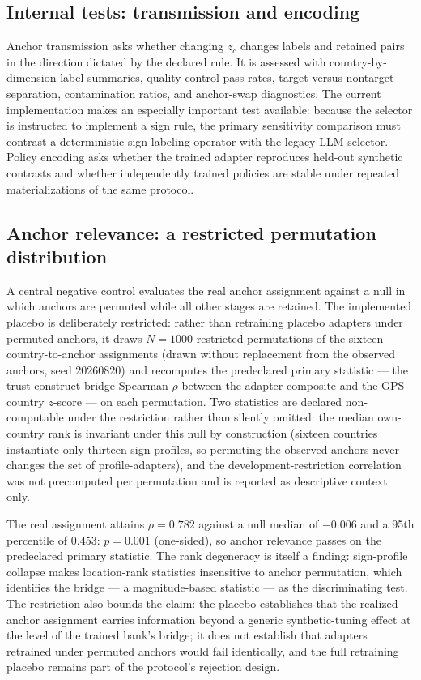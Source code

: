 \documentclass[10pt,letterpaper]{article}
\begin{document}
\subsection{Internal tests: transmission and encoding}
Anchor transmission asks whether changing $z_c$ changes labels and retained pairs in the direction dictated by the declared rule. It is assessed with country-by-dimension label summaries, quality-control pass rates, target-versus-nontarget separation, contamination ratios, and anchor-swap diagnostics. The current implementation makes an especially important test available: because the selector is instructed to implement a sign rule, the primary sensitivity comparison must contrast a deterministic sign-labeling operator with the legacy LLM selector. Policy encoding asks whether the trained adapter reproduces held-out synthetic contrasts and whether independently trained policies are stable under repeated materializations of the same protocol.

\subsection{Anchor relevance: a restricted permutation distribution}\label{sec:placebo}
A central negative control evaluates the real anchor assignment against a null in which anchors are permuted while all other stages are retained. The implemented placebo is deliberately restricted: rather than retraining placebo adapters under permuted anchors, it draws $N{=}1000$ restricted permutations of the sixteen country-to-anchor assignments (drawn without replacement from the observed anchors, seed $20260820$) and recomputes the predeclared primary statistic --- the trust construct-bridge Spearman $\rho$ between the adapter composite and the GPS country $z$-score --- on each permutation. Two statistics are declared non-computable under the restriction rather than silently omitted: the median own-country rank is invariant under this null by construction (sixteen countries instantiate only thirteen sign profiles, so permuting the observed anchors never changes the set of profile-adapters), and the development-restriction correlation was not precomputed per permutation and is reported as descriptive context only.

The real assignment attains $\rho = 0.782$ against a null median of $-0.006$ and a 95th percentile of $0.453$: $p = 0.001$ (one-sided), so anchor relevance passes on the predeclared primary statistic. The rank degeneracy is itself a finding: sign-profile collapse makes location-rank statistics insensitive to anchor permutation, which identifies the bridge --- a magnitude-based statistic --- as the discriminating test. The restriction also bounds the claim: the placebo establishes that the realized anchor assignment carries information beyond a generic synthetic-tuning effect at the level of the trained bank's bridge; it does not establish that adapters retrained under permuted anchors would fail identically, and the full retraining placebo remains part of the protocol's rejection design.
\end{document}
